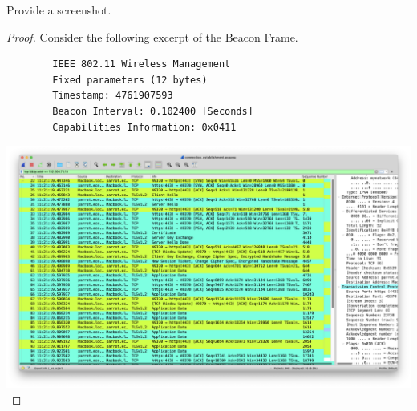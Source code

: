 \documentclass[../../main.tex]{subfiles}
\begin{document}
\begin{wts}
Provide a screenshot.  
\end{wts}
\begin{proof}
Consider the following excerpt of the Beacon Frame.
    \begin{lstlisting}
        IEEE 802.11 Wireless Management
        Fixed parameters (12 bytes)
        Timestamp: 4761907593
        Beacon Interval: 0.102400 [Seconds]
        Capabilities Information: 0x0411
    \end{lstlisting}
    \includegraphics[width=\textwidth]{subfiles/images/L4N1_PAGE15_LIST_OF_PACKETS_1.png}
\end{proof}
\end{document}
